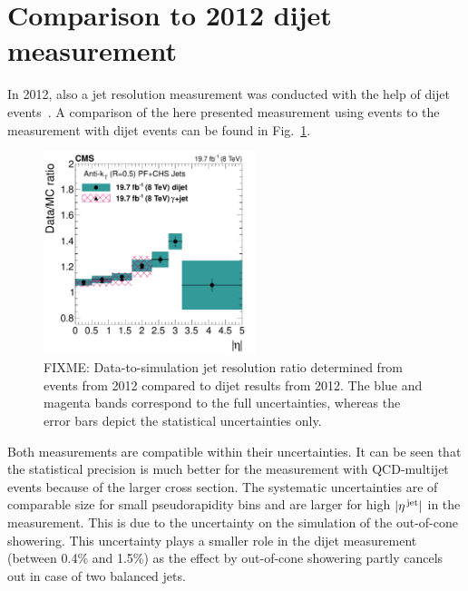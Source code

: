 \section{Comparison to 2012 dijet measurement}
\label{res:sec:comparison_2012}
In 2012, also a jet \pt resolution measurement was conducted with the help of dijet events~\cite{bib:CMS:JME_PAS,bib:Kristin_Thesis}.
A comparison of the here presented measurement using \GAMJET events to the measurement with dijet events can be found in Fig.~\ref{res:fig:Comparison_2012}.
\begin{figure}[b]
 \centering
    \includegraphics[width=0.55\textwidth]{figures/resolution/results/JER_2012_compPhoton_final_v2.pdf}
  \caption{FIXME: Data-to-simulation jet \pt resolution ratio determined from \GAMJET events from 2012 compared to dijet results from 2012.
           The blue and magenta bands correspond to the full uncertainties, whereas the error bars depict the statistical uncertainties only.}
  \label{res:fig:Comparison_2012}
\end{figure}
Both measurements are compatible within their uncertainties.
It can be seen that the statistical precision is much better for the measurement with QCD-multijet events because of the larger cross section.
The systematic uncertainties are of comparable size for small pseudorapidity bins and are larger for high $|{\eta}^{\text{\,jet}}|$ in the \GAMJET measurement.
This is due to the uncertainty on the simulation of the out-of-cone showering.
This uncertainty plays a smaller role in the dijet measurement (between 0.4\% and 1.5\%) as the effect by out-of-cone showering partly cancels out in case of two balanced jets.

